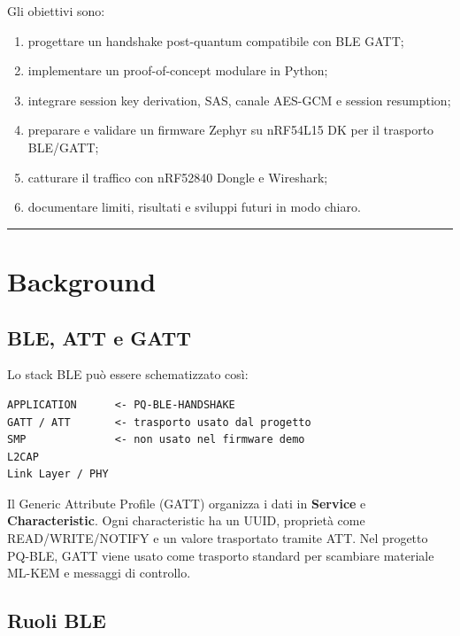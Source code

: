 \documentclass[11pt,a4paper]{article}
\providecommand{\tightlist}{\setlength{\itemsep}{0pt}\setlength{\parskip}{0pt}}
\begin{document}
Gli obiettivi sono:

\begin{enumerate}
\def\labelenumi{\arabic{enumi}.}
\tightlist
\item
  progettare un handshake post-quantum compatibile con BLE GATT;
\item
  implementare un proof-of-concept modulare in Python;
\item
  integrare session key derivation, SAS, canale AES-GCM e session
  resumption;
\item
  preparare e validare un firmware Zephyr su nRF54L15 DK per il
  trasporto BLE/GATT;
\item
  catturare il traffico con nRF52840 Dongle e Wireshark;
\item
  documentare limiti, risultati e sviluppi futuri in modo chiaro.
\end{enumerate}

\begin{center}\rule{0.5\linewidth}{0.5pt}\end{center}

\section{Background}\label{capitolo-2---background}

\subsection{BLE, ATT e GATT}\label{ble-att-e-gatt}

Lo stack BLE può essere schematizzato così:

\begin{lstlisting}
APPLICATION      <- PQ-BLE-HANDSHAKE
GATT / ATT       <- trasporto usato dal progetto
SMP              <- non usato nel firmware demo
L2CAP
Link Layer / PHY
\end{lstlisting}

Il Generic Attribute Profile (GATT) organizza i dati in \textbf{Service}
e \textbf{Characteristic}. Ogni characteristic ha un UUID, proprietà
come READ/WRITE/NOTIFY e un valore trasportato tramite ATT. Nel progetto
PQ-BLE, GATT viene usato come trasporto standard per scambiare materiale
ML-KEM e messaggi di controllo.

\subsection{Ruoli BLE}\label{ruoli-ble}
\end{document}
